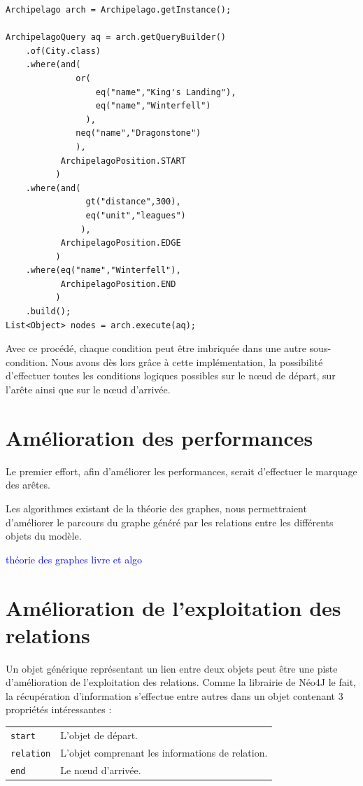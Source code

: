 \documentclass[a4paper,fleqn,12pt]{report}
\begin{document}
\begin{lstlisting}
Archipelago arch = Archipelago.getInstance();

ArchipelagoQuery aq = arch.getQueryBuilder()
    .of(City.class)
    .where(and(
              or(
      	          eq("name","King's Landing"),
    	          eq("name","Winterfell")
    	        ),
    	      neq("name","Dragonstone")
    	      ),
    	   ArchipelagoPosition.START
    	  )
    .where(and(
      	        gt("distance",300),
    	        eq("unit","leagues")
    	       ),
    	   ArchipelagoPosition.EDGE
    	  )
    .where(eq("name","Winterfell"),
    	   ArchipelagoPosition.END
    	  )
    .build();
List<Object> nodes = arch.execute(aq);

\end{lstlisting}

Avec ce procédé, chaque condition peut être imbriquée dans une autre sous-condition. Nous avons dès lors grâce à cette implémentation, la possibilité d'effectuer toutes les conditions logiques possibles sur le nœud de départ, sur l'arête ainsi que sur le nœud d'arrivée.

\section{Amélioration des performances}

Le premier effort, afin d'améliorer les performances, serait d'effectuer le marquage des arêtes.

Les algorithmes existant de la théorie des graphes, nous permettraient d'améliorer le parcours du graphe généré par les relations entre les différents objets du modèle.

\textcolor{blue}{théorie des graphes livre et algo}
\section{Amélioration de l'exploitation des relations}

Un objet générique représentant un lien entre deux objets peut être une piste d'amélioration de l'exploitation des relations. Comme la librairie de Néo4J le fait, la récupération d'information s'effectue entre autres dans un objet contenant 3 propriétés intéressantes :

\begin{tabular}[c]{l M{12cm}}
\texttt{start} & L'objet de départ.  \tabularnewline
\texttt{relation} & L'objet comprenant les informations de relation.  \tabularnewline
\texttt{end} & Le nœud d'arrivée.  \tabularnewline
\end{tabular}
\end{document}
